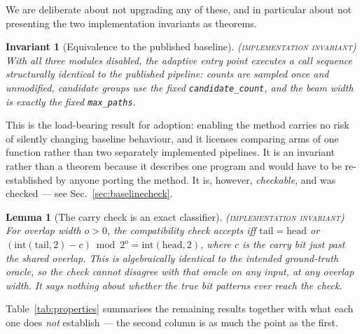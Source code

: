\documentclass[preprint,11pt]{elsarticle}
\newcommand{\INVAR}{\textsc{(implementation invariant)}}
\newtheorem{lemma}{Lemma}
\newtheorem{invariant}{Invariant}
\begin{document}
\noindent
We are deliberate about not upgrading any of these, and in particular
about not presenting the two implementation invariants as theorems.

\begin{invariant}[Equivalence to the published baseline]
\label{prop:baseline}
\INVAR{} With all three modules disabled, the adaptive entry point
executes a call sequence structurally identical to the published
pipeline: counts are sampled once and unmodified, candidate groups use
the fixed \texttt{candidate\_count}, and the beam width is exactly the
fixed \texttt{max\_paths}.
\end{invariant}

This is the load-bearing result for adoption: enabling the method carries
no risk of silently changing baseline behaviour, and it licenses
comparing arms of one function rather than two separately implemented
pipelines. It is an invariant rather than a theorem because it describes
one program and would have to be re-established by anyone porting the
method. It is, however, \emph{checkable}, and was checked --- see
Sec.~\ref{sec:baselinecheck}.

\begin{lemma}[The carry check is an exact classifier]
\label{lem:carry}
\INVAR{} For overlap width $o>0$, the compatibility check accepts
\emph{iff} $\mathrm{tail}=\mathrm{head}$ or
$(\mathrm{int}(\mathrm{tail},2)-c)\bmod 2^{o}=\mathrm{int}(\mathrm{head},2)$,
where $c$ is the carry bit just past the shared overlap. This is
algebraically identical to the intended ground-truth oracle, so the check
cannot disagree with that oracle on \emph{any} input, at any overlap
width. It says nothing about whether the \emph{true} bit patterns ever
reach the check.
\end{lemma}

Table~\ref{tab:properties} summarises the remaining results together with
what each one does \emph{not} establish --- the second column is as much
the point as the first.
\end{document}
